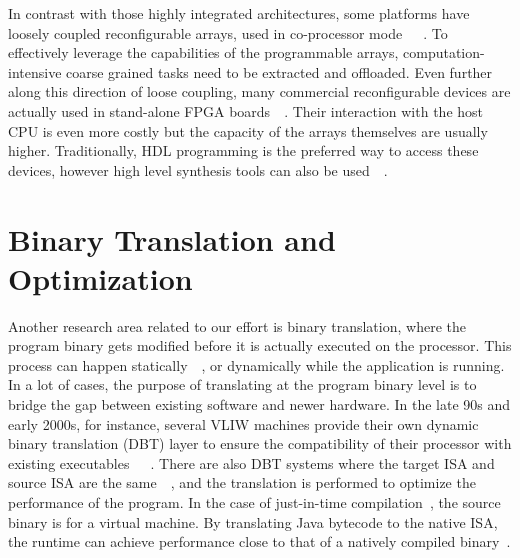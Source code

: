 In contrast with those highly integrated architectures, some platforms have loosely
coupled reconfigurable arrays, used in co-processor mode~\cite{624600}~\cite{Lee:2000:DIM:344169.344172}~\cite{chips:viipro}. To effectively
leverage the capabilities of the programmable arrays, computation-intensive coarse grained 
tasks need to be extracted and offloaded. 
Even further along this direction of loose coupling,
many commercial reconfigurable devices are actually used in stand-alone FPGA boards~\cite{boards:alpha}~\cite{boards:terasic}.
Their interaction with the host CPU is even more costly but the capacity of the
arrays themselves are usually higher. Traditionally, HDL programming is the preferred
way to access these devices, however high level synthesis tools can also be used~\cite{839323}~\cite{Singh:2013:HPF:2435264.2435268}.






\section{Binary Translation and Optimization}
\label{binpar}
Another research area related to our effort is binary translation, where
the program binary gets modified before it is actually executed on the processor.
This process can happen statically~\cite{chen2008static}~\cite{shen2012llbt}, or dynamically while the application is running.
In a lot of cases, the purpose of translating at the program binary level is to
bridge the gap between existing software and newer hardware. In the late 90s and early 2000s, for instance, several VLIW machines provide their own dynamic binary translation (DBT) layer to ensure the compatibility of their processor with existing executables~\cite{Ebcioglu:1997:DDC:264107.264126}~\cite{Dehnert:2003:TCM:776261.776263}~\cite{Baraz:2003:IEL:956417.956550}. 
There are also DBT systems where the target ISA and source ISA are the same~\cite{Bala:2000:DTD:358438.349303}~\cite{deaver1999wiggins}, 
and the translation is performed to optimize the performance of the program.
In the case of just-in-time compilation~\cite{adl1998fast}, the source binary is for a virtual machine. By translating Java bytecode to the native ISA, the runtime can achieve performance
close to that of a natively compiled binary~\cite{Gherardi:2012:JVC:2428224.2428245}.

